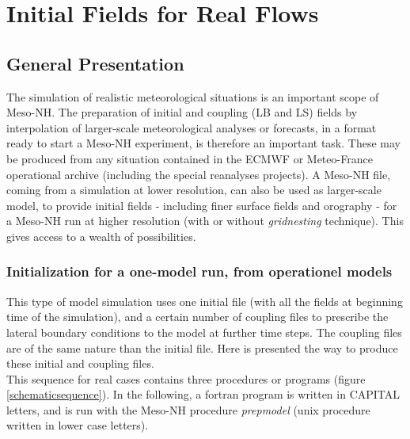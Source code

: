%
\chapter{Initial Fields for Real Flows\label{REAL}}
\minitoc

\section{General Presentation}
The simulation of realistic meteorological situations is an important scope
of Meso-NH. The preparation of initial and coupling (LB and LS) fields
by interpolation of larger-scale
meteorological analyses or forecasts, in a format ready to start a Meso-NH
experiment, is therefore an important task.
These may be produced from any situation contained in the ECMWF or Meteo-France
operational archive (including the special reanalyses projects).
A Meso-NH file, coming from a simulation at lower resolution,
can also be used as larger-scale model, to provide initial fields
- including finer surface fields and orography - for
a Meso-NH run at higher resolution
(with or without {\it gridnesting} technique).
This gives access to a wealth of possibilities.\\

\subsection{Initialization for a one-model run, from operationel models}

This type of model simulation uses one initial file (with all the fields
at beginning time of the simulation), and a certain number of coupling files
to prescribe the lateral boundary conditions to the model at further
time steps. The coupling files are of the same nature than the initial file.
Here is presented the way to produce these initial and coupling files.\\

This sequence for real cases contains three procedures or
programs (figure \ref{schematicsequence}).
In the following, a fortran program is written in CAPITAL letters,
and is run with the Meso-NH procedure {\sl prepmodel} (unix procedure
written in lower case letters).

